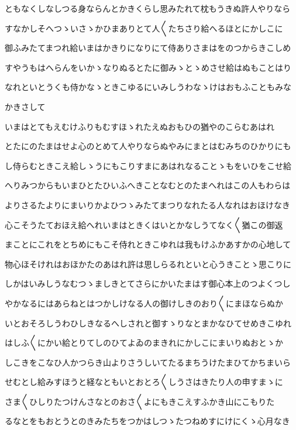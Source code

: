 \documentclass[a4paper,11pt,landscape]{ltjtarticle}
\begin{document}
\par\medskip
ともなくしなしつる身ならんとかきくらし思みたれて枕もうきぬ許人やりなら
\par\medskip
すなかしそへつゝいさゝかひまありとて人〱たちさり給へるほとにかしこに
\par\medskip
御ふみたてまつれ給いまはかきりになりにて侍ありさまはをのつからきこしめ
\par\medskip
すやうもはへらんをいかゝなりぬるとたに御みゝとゝめさせ給はぬもことはり
\par\medskip
なれといとうくも侍かなゝときこゆるにいみしうわなゝけはおもふこともみな
\par\medskip
かきさして
\par\medskip
いまはとてもえむけふりもむすほゝれたえぬおもひの猶やのこらむあはれ
\par\medskip
とたにのたまはせよ心のとめて人やりならぬやみにまとはむみちのひかりにも
\par\medskip
し侍らむときこえ給しゝうにもこりすまにあはれなることゝもをいひをこせ給
\par\medskip
へりみつからもいまひとたひいふへきことなむとのたまへれはこの人もわらは
\par\medskip
よりさるたよりにまいりかよひつゝみたてまつりなれたる人なれはおほけなき
\par\medskip
心こそうたておほえ給へれいまはときくはいとかなしうてなく〱猶この御返
\par\medskip
まことにこれをとちめにもこそ侍れときこゆれは我もけふかあすかの心地して
\par\medskip
物心ほそけれはおほかたのあはれ許は思しらるれといと心うきことゝ思こりに
\par\medskip
しかはいみしうなむつゝましきとてさらにかいたまはす御心本上のつよくつし
\par\medskip
やかなるにはあらねとはつかしけなる人の御けしきのおり〱にまほならぬか
\par\medskip
いとおそろしうわひしきなるへしされと御すゝりなとまかなひてせめきこゆれ
\par\medskip
はしふ〱にかい給とりてしのひてよゐのまきれにかしこにまいりぬおとゝか
\par\medskip
しこきをこなひ人かつらき山よりさうしいてたるまちうけたまひてかちまいら
\par\medskip
せむとし給みすほうと経なともいとおとろ〱しうさはきたり人の申すまゝに
\par\medskip
さま〱ひしりたつけんさなとのおさ〱よにもきこえすふかき山にこもりた
\par\medskip
るなとをもおとうとのきみたちをつかはしつゝたつねめすにけにくゝ心月なき
\end{document}
